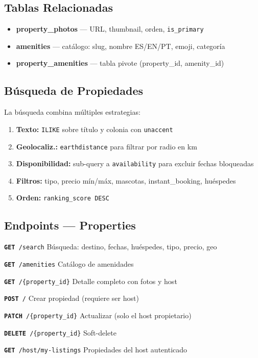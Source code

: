 \documentclass[12pt,a4paper]{report}
\newcommand{\apiendpoint}[3]{%
  \noindent\texttt{\textcolor{beelprimary}{\textbf{#1}}\ \textcolor{beeltier}{#2}}%
  \hfill\textcolor{beelgray}{\small #3}\par\smallskip
}
\begin{document}
\subsection{Tablas Relacionadas}

\begin{itemize}[leftmargin=*]
  \item \textbf{property\_photos} --- URL, thumbnail, orden, \texttt{is\_primary}
  \item \textbf{amenities} --- cat\'alogo: slug, nombre ES/EN/PT, emoji, categor\'ia
  \item \textbf{property\_amenities} --- tabla pivote (property\_id, amenity\_id)
\end{itemize}

\subsection{B\'usqueda de Propiedades}

La b\'usqueda combina m\'ultiples estrategias:
\begin{enumerate}[leftmargin=*]
  \item \textbf{Texto:} \texttt{ILIKE} sobre t\'itulo y colonia con \texttt{unaccent}
  \item \textbf{Geolocaliz.:} \texttt{earthdistance} para filtrar por radio en km
  \item \textbf{Disponibilidad:} sub-query a \texttt{availability} para excluir fechas bloqueadas
  \item \textbf{Filtros:} tipo, precio m\'in/m\'ax, mascotas, instant\_booking, hu\'espedes
  \item \textbf{Orden:} \texttt{ranking\_score DESC}
\end{enumerate}

\subsection{Endpoints --- Properties}

\begin{tcolorbox}[beelinfo, title={/api/v1/properties}]
\apiendpoint{GET}{/search}{B\'usqueda: destino, fechas, hu\'espedes, tipo, precio, geo}
\apiendpoint{GET}{/amenities}{Cat\'alogo de amenidades}
\apiendpoint{GET}{/\{property\_id\}}{Detalle completo con fotos y host}
\apiendpoint{POST}{/}{Crear propiedad (requiere ser host)}
\apiendpoint{PATCH}{/\{property\_id\}}{Actualizar (solo el host propietario)}
\apiendpoint{DELETE}{/\{property\_id\}}{Soft-delete}
\apiendpoint{GET}{/host/my-listings}{Propiedades del host autenticado}
\end{tcolorbox}
\end{document}
